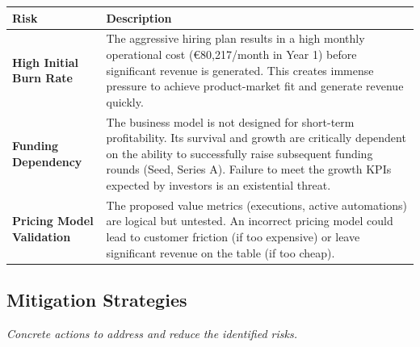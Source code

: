 \documentclass[11pt, a4paper, oneside]{article}
\begin{document}
\begin{table}[H]
\centering
\begin{tabularx}{\textwidth}{@{}lL@{}}
\toprule
\textbf{Risk} & \textbf{Description} \\
\midrule
\textbf{High Initial Burn Rate} & The aggressive hiring plan results in a high monthly operational cost (€80,217/month in Year 1) before significant revenue is generated. This creates immense pressure to achieve product-market fit and generate revenue quickly. \\
\addlinespace
\textbf{Funding Dependency} & The business model is not designed for short-term profitability. Its survival and growth are critically dependent on the ability to successfully raise subsequent funding rounds (Seed, Series A). Failure to meet the growth KPIs expected by investors is an existential threat. \\
\addlinespace
\textbf{Pricing Model Validation} & The proposed value metrics (executions, active automations) are logical but untested. An incorrect pricing model could lead to customer friction (if too expensive) or leave significant revenue on the table (if too cheap). \\
\bottomrule
\end{tabularx}
\end{table}

\newpage
\subsection{Mitigation Strategies}
\textit{Concrete actions to address and reduce the identified risks.}
\end{document}
